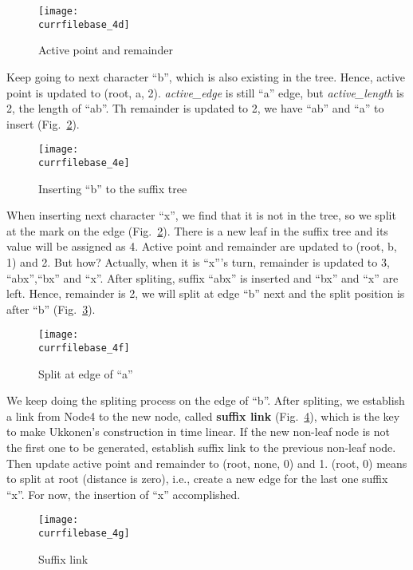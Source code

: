 \documentclass[catalog.tex]{subfiles}
\begin{document}
		\begin{figure}[!htb]
			\centering
			\texttt{[image: \\currfilebase\_4d]}
			\caption{Active point and remainder\cite{UkkonenAnimation}}
			\label{fig:\currfilebase_4d}
		\end{figure}


		\newpage
		Keep going to next character ``b'', which is also existing in the tree. Hence, active point is updated to (root, a, 2). {\it active\_edge} is still ``a'' edge, but {\it active\_length} is 2, the length of ``ab''. Th remainder is updated to 2, we have ``ab'' and ``a'' to insert (Fig.~\ref{fig:\currfilebase_4e}).


		\begin{figure}[!htb]
			\centering
			\texttt{[image: \\currfilebase\_4e]}
			\caption{Inserting ``b'' to the suffix tree\cite{UkkonenAnimation}}
			\label{fig:\currfilebase_4e}
		\end{figure}


		When inserting next character ``x'', we find that it is not in the tree, so we split at the mark on the edge (Fig.~\ref{fig:\currfilebase_4e}). There is a new leaf in the suffix tree and its value will be assigned as 4. Active point and remainder are updated to (root, b, 1) and 2. But how? Actually, when it is ``x'''s turn, remainder is updated to 3, ``abx'',``bx'' and ``x''. After spliting, suffix ``abx'' is inserted and ``bx'' and ``x'' are left. Hence, remainder is 2, we will split at edge ``b'' next and the split position is after ``b'' (Fig.~\ref{fig:\currfilebase_4f}).


		\begin{figure}[!htb]
			\centering
			\texttt{[image: \\currfilebase\_4f]}
			\caption{Split at edge of ``a''\cite{UkkonenAnimation}}
			\label{fig:\currfilebase_4f}
		\end{figure}


		We keep doing the spliting process on the edge of ``b''. After spliting, we establish a link from Node4 to the new node, called {\bf suffix link} (Fig.~\ref{fig:\currfilebase_4g}), which is the key to make Ukkonen's construction in time linear. If the new non-leaf node is not the first one to be generated, establish suffix link to the previous non-leaf node. Then update active point and remainder to (root, none, 0) and 1. (root, 0) means to split at root (distance is zero), i.e., create a new edge for the last one suffix ``x''. For now, the insertion of ``x'' accomplished.


		\begin{figure}[!htb]
			\centering
			\texttt{[image: \\currfilebase\_4g]}
			\caption{Suffix link\cite{UkkonenAnimation}}
			\label{fig:\currfilebase_4g}
		\end{figure}
\end{document}

